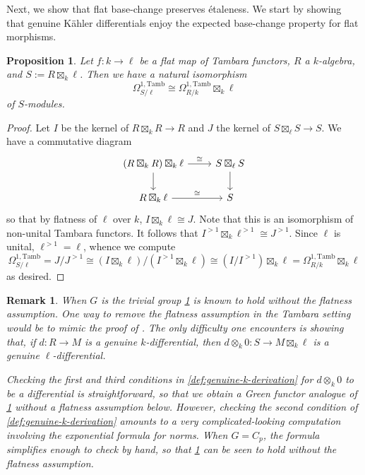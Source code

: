\documentclass[11pt,dvipsnames]{amsart}
\newtheorem{proposition}[theorem]{Proposition}
\theoremstyle{BoldRemark}
\newtheorem{remark}[theorem]{Remark}
\newcommand{\Tamb}{\mathrm{Tamb}}
\begin{document}
Next, we show that flat base-change preserves \'{e}taleness. We start by showing that genuine K\"{a}hler differentials enjoy the expected base-change property for flat morphisms.

\begin{proposition}\label{prop:Kahler-differentials-of-base-change}
    Let $f : k \rightarrow \ell$ be a flat map of Tambara functors, $R$ a $k$-algebra, and $S := R \boxtimes_k \ell$. Then we have a natural isomorphism 
    \[ 
        \Omega^{1,\Tamb}_{S/\ell} \cong \Omega^{1,\Tamb}_{R/k} \boxtimes_k \ell
    \]
    of $S$-modules.
\end{proposition}

\begin{proof}
    Let $I$ be the kernel of $R \boxtimes_k R \rightarrow R$ and $J$ the kernel of $S \boxtimes_\ell S \rightarrow S$. We have a commutative diagram 
    \[ \begin{tikzcd}
        (R \boxtimes_k  R) \boxtimes_k \ell \arrow[r, "\cong"] \arrow[d] & S \boxtimes_\ell S \arrow[d] \\
        R \boxtimes_k \ell \arrow[r, "\cong"] & S 
    \end{tikzcd} \]
    so that by flatness of $\ell$ over $k$, $I 
    \boxtimes_k \ell \cong J$. Note that this is an isomorphism of non-unital Tambara functors. It follows that $I^{>1} \boxtimes_k \ell^{>1} \cong J^{>1}$. Since $\ell$ is unital, $\ell^{>1} = \ell$, whence we compute 
    \[ 
        \Omega^{1,\Tamb}_{S/\ell} = J/J^{>1} \cong (I \boxtimes_k \ell)/(I^{>1} \boxtimes_k \ell) \cong (I/I^{>1}) \boxtimes_k \ell = \Omega^{1,\Tamb}_{R/k} \boxtimes_k \ell 
    \] 
    as desired.
\end{proof}

\begin{remark}
    When $G$ is the trivial group \cref{prop:Kahler-differentials-of-base-change} is known to hold without the flatness assumption. One way to remove the flatness assumption in the Tambara setting would be to mimic the proof of \cite[Lemma 10.131.12]{stacks-project}. The only difficulty one encounters is showing that, if $d : R \rightarrow M$ is a genuine $k$-differential, then $d \otimes_k 0 : S \rightarrow M \boxtimes_k \ell$ is a genuine $\ell$-differential. 
    
    Checking the first and third conditions in \cref{def:genuine-k-derivation} for $d \otimes_k 0$ to be a differential is straightforward, so that we obtain a Green functor analogue of \cref{prop:Kahler-differentials-of-base-change} without a flatness assumption below. However, checking the second condition of \cref{def:genuine-k-derivation} amounts to a very complicated-looking computation involving the exponential formula for norms. When $G = C_p$, the formula simplifies enough to check by hand, so that \cref{prop:Kahler-differentials-of-base-change} can be seen to hold without the flatness assumption.
\end{remark}
\end{document}
